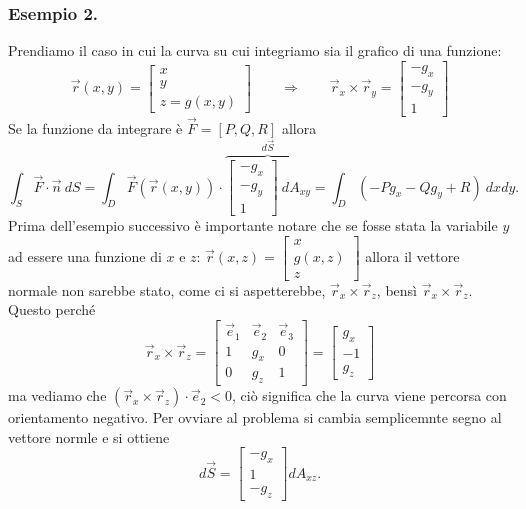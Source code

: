 \documentclass[10pt]{article}
\theoremstyle{plain}
\theoremstyle{definition}
\begin{document}
\subsubsection{Esempio 2.}
Prendiamo il caso in cui la curva su cui integriamo sia il grafico di una funzione:
$$\vec{r}(x,y)=\begin{bmatrix}
x \\ y \\ z=g(x,y)
\end{bmatrix}\qquad \Longrightarrow
\qquad \vec{r}_x \times \vec{r}_y = \begin{bmatrix}
-g_x \\ -g_y \\ 1
\end{bmatrix}
$$
Se la funzione da integrare è $\vec{F}=[P,Q,R]$ allora
$$ \int_S \vec{F}\cdot \vec{n}\ dS = \int_D\vec{F}(\vec{r}(x,y))\cdot \overbrace{\begin{bmatrix}
-g_x \\ -g_y \\ 1
\end{bmatrix} \ dA_{xy}}^{d\vec{S}} = \int_D(-Pg_x-Qg_y+R)\ dxdy.
$$
Prima dell'esempio successivo è importante notare che se fosse stata la variabile $y$ ad essere una funzione di $x$ e $z$:
$\vec{r}(x,z)=\begin{bmatrix}
x\\ g(x,z) \\ z
\end{bmatrix}$
allora il vettore normale non sarebbe stato, come ci si aspetterebbe, $\vec{r}_x \times \vec{r}_z$, bensì $\vec{r}_x \times \vec{r}_z$.
Questo perché
$$\vec{r}_x \times \vec{r}_z=\begin{bmatrix}
\vec{e}_1 & \vec{e}_2 &\vec{e}_3 \\
1 & g_x & 0\\
0& g_z &1
\end{bmatrix} = 
\begin{bmatrix}
g_x \\
-1\\
g_z
\end{bmatrix}
$$ ma vediamo che $(\vec{r}_x \times \vec{r}_z)\cdot \vec{e}_2 < 0$, ciò significa che la curva viene percorsa con orientamento negativo. Per ovviare al problema si cambia semplicemnte segno al vettore normle e si ottiene
$$ d\vec{S} = \begin{bmatrix}
-g_x \\
1\\
-g_z
\end{bmatrix}dA_{xz}.
$$
\end{document}
